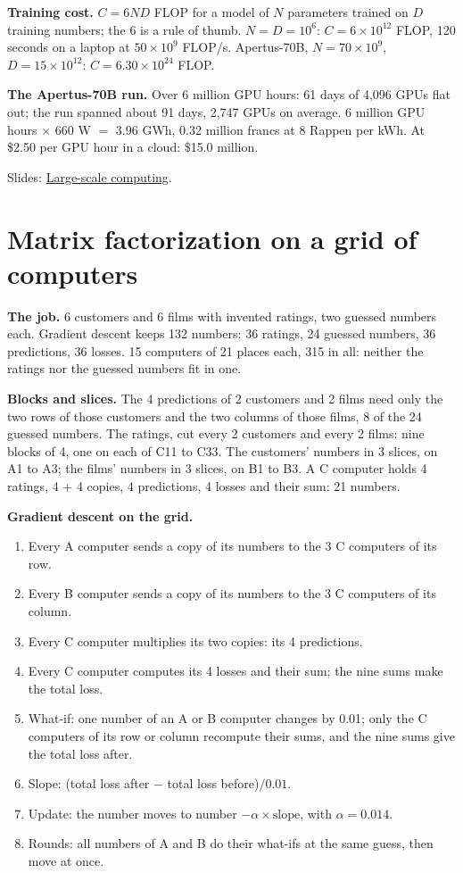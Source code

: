 \documentclass[11pt,a4paper]{article}
\newcommand{\term}[1]{\textbf{#1}}
\newcommand{\Clusters}{\href{https://eth-ainit-hs26.github.io/AINIT-PAGE/slides/we2/ainit-hs26-large-scale-computing.pdf}{Large-scale computing}}
\begin{document}
\term{Training cost.} $C = 6ND$ FLOP for a model of $N$ parameters trained on $D$ training numbers; the 6 is a rule
of thumb. $N = D = 10^6$: $C = 6 \times 10^{12}$ FLOP, 120 seconds on a laptop at $50 \times 10^9$ FLOP/s.
Apertus-70B, $N = 70 \times 10^9$, $D = 15 \times 10^{12}$: $C = 6.30 \times 10^{24}$ FLOP.

\term{The Apertus-70B run.} Over 6 million GPU hours: 61 days of 4,096 GPUs flat out; the run spanned about 91
days, 2,747 GPUs on average. 6 million GPU hours $\times$ 660 W $=$ 3.96 GWh, 0.32 million
francs at 8 Rappen per kWh. At \$2.50 per GPU hour in a cloud: \$15.0 million.

Slides: \Clusters.

\section{Matrix factorization on a grid of computers}

\term{The job.} 6 customers and 6 films with invented ratings, two guessed numbers each. Gradient descent keeps 132 numbers: 36 ratings,
24 guessed numbers, 36 predictions, 36 losses. 15 computers of 21 places each, 315 in all: neither the
ratings nor the guessed numbers fit in one.

\term{Blocks and slices.} The 4 predictions of 2 customers and 2 films need only the two rows of those customers and
the two columns of those films, 8 of the 24 guessed numbers. The ratings, cut every 2 customers and every 2 films:
nine blocks of 4, one on each of C11 to C33. The customers' numbers in 3 slices, on A1 to A3; the films' numbers in
3 slices, on B1 to B3. A C computer holds 4 ratings, 4 + 4 copies, 4 predictions, 4 losses and their sum: 21
numbers.

\begin{center}

\end{center}

\term{Gradient descent on the grid.}
\begin{enumerate}
\item Every A computer sends a copy of its numbers to the 3 C computers of its row.
\item Every B computer sends a copy of its numbers to the 3 C computers of its column.
\item Every C computer multiplies its two copies: its 4 predictions.
\item Every C computer computes its 4 losses and their sum; the nine sums make the total loss.
\item What-if: one number of an A or B computer changes by 0.01; only the C computers of its row or column
  recompute their sums, and the nine sums give the total loss after.
\item Slope: (total loss after $-$ total loss before)$/0.01$.
\item Update: the number moves to number $- \alpha \times \text{slope}$, with $\alpha = 0.014$.
\item Rounds: all numbers of A and B do their what-ifs at the same guess, then move at once.
\end{enumerate}
\end{document}
